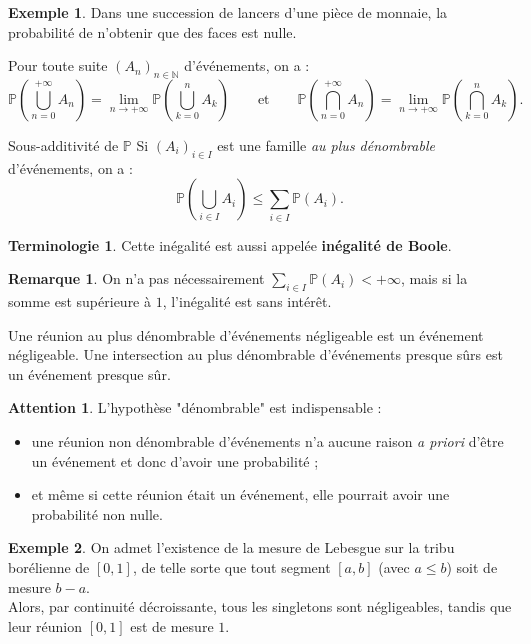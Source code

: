 \documentclass[french]{article}
\renewcommand{\P}{\mathbb{P}}
\newcommand{\N}{\mathbb{N}}
\theoremstyle{plain}
\theoremstyle{definition}
\newtheorem*{ex}{Exemple}
\newtheorem*{rmq}{Remarque}
\newtheorem*{terminologie}{Terminologie}
\newtheorem*{attention}{Attention}
\theoremstyle{remark}
\begin{document}
\begin{ex}
	Dans une succession de lancers d'une pièce de monnaie, la probabilité de n'obtenir que des faces est nulle.
\end{ex}

\begin{thm}{}%
	Pour toute suite $(A_n)_{n\in\N}$ d'événements, on a :
	$$\P\left(\bigcup_{n=0}^{+\infty}A_n\right)=\underset{n\to+\infty}{\lim}\P\left(\bigcup_{k=0}^{n}A_k\right)\quad\quad\text{et}\quad\quad\P\left(\bigcap_{n=0}^{+\infty}A_n\right)=\underset{n\to+\infty}{\lim}\P\left(\bigcap_{k=0}^{n}A_k\right).$$
\end{thm}

\begin{thm}{Sous-additivité de $\P$}%
	Si $(A_i)_{i\in I}$ est une famille \textit{au plus dénombrable} d'événements, on a :
	$$\P\left(\bigcup_{i\in I}A_i\right)\leqslant\sum_{i\in I}\P(A_i).$$
\end{thm}

\begin{terminologie}
	Cette inégalité est aussi appelée \textbf{inégalité de Boole}.
\end{terminologie}

\begin{rmq}
	On n'a pas nécessairement $\displaystyle\sum_{i\in I}\P(A_i)<+\infty$, mais si la somme est supérieure à $1$, l'inégalité est sans intérêt.
\end{rmq}

\begin{thm}{}%
	Une réunion au plus dénombrable d'événements négligeable est un événement négligeable. Une intersection au plus dénombrable d'événements presque sûrs est un événement presque sûr.
\end{thm}

\begin{attention}
	L'hypothèse "dénombrable" est indispensable :
	\begin{itemize}
		\item une réunion non dénombrable d'événements n'a aucune raison \textit{a priori} d'être un événement et donc d'avoir une probabilité ;
		\item et même si cette réunion était un événement, elle pourrait avoir une probabilité non nulle.
	\end{itemize}
\end{attention}

\begin{ex}
	On admet l'existence de la mesure de Lebesgue sur la tribu borélienne de $[0,1]$, de telle sorte que tout segment $[a,b]$ (avec $a\leqslant b$) soit de mesure $b-a$.\\
	Alors, par continuité décroissante, tous les singletons sont négligeables, tandis que leur réunion $[0,1]$ est de mesure $1$.
\end{ex}
\end{document}
